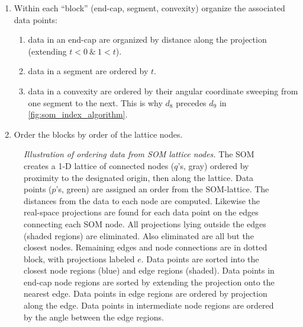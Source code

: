 \documentclass[fleqn,usenatbib]{mnras}
\begin{document}
\begin{enumerate}[label={(\bfseries \arabic*):}, leftmargin=*]
\begin{enumerate}[label={(\bfseries \arabic*):}, leftmargin=*]
          \end{enumerate}
        \item Within each ``block'' (end-cap, segment, convexity) organize the
        associated data points:
          \begin{enumerate}
              \item data in an end-cap are organized by distance along the
              projection (extending $t < 0 \ \& \ 1 < t$).
              \item data in a segment are ordered by $t$.
              \item data in a convexity are ordered by their angular coordinate
              sweeping from one segment to the next. This is why $d_8$ precedes
              $d_9$ in \autoref{fig:som_index_algorithm}.
          \end{enumerate}
        \item Order the blocks by order of the lattice nodes.
      \end{enumerate}

      \begin{figure*}
        \centering
        \caption{
          \emph{Illustration of ordering data from SOM lattice nodes.}
          The SOM creates a 1-D lattice of connected nodes ($q$'s, gray) ordered
          by proximity to the designated origin, then along the lattice. Data
          points ($p$'s, green) are assigned an order from the SOM-lattice. The
          distances from the data to each node are computed. Likewise the
          real-space projections are found for each data point on the edges
          connecting each SOM node. All projections lying outside the edges
          (shaded regions) are eliminated. Also eliminated are all but the
          closest nodes. Remaining edges and node connections are in dotted
          block, with projections labeled $e$. Data points are sorted into the
          closest node regions (blue) and edge regions (shaded). Data points in
          end-cap node regions are sorted by extending the projection onto the
          nearest edge. Data points in edge regions are ordered by projection
          along the edge. Data points in intermediate node regions are ordered
          by the angle between the edge regions. }
        \label{fig:som_index_algorithm}
      \end{figure*}
\end{document}
